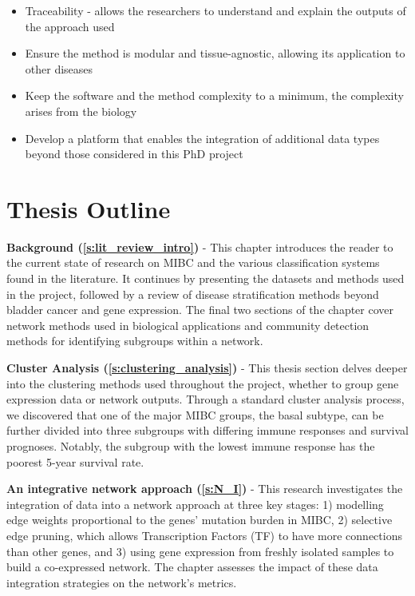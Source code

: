\begin{itemize}
    \item Traceability - allows the researchers to understand and explain the outputs of the approach used
    \item Ensure the method is modular and tissue-agnostic, allowing its application to other diseases
    \item Keep the software and the method complexity to a minimum, the complexity arises from the biology
    \item Develop a platform that enables the integration of additional data types beyond those considered in this PhD project
\end{itemize}

\section{Thesis Outline}

\textbf{Background (\cref{s:lit_review_intro})} - This chapter introduces the reader to the current state of research on MIBC and the various classification systems found in the literature. It continues by presenting the datasets and methods used in the project, followed by a review of disease stratification methods beyond bladder cancer and gene expression. The final two sections of the chapter cover network methods used in biological applications and community detection methods for identifying subgroups within a network.


\textbf{Cluster Analysis (\cref{s:clustering_analysis})} - This thesis section delves deeper into the clustering methods used throughout the project, whether to group gene expression data or network outputs. Through a standard cluster analysis process, we discovered that one of the major MIBC groups, the basal subtype, can be further divided into three subgroups with differing immune responses and survival prognoses. Notably, the subgroup with the lowest immune response has the poorest 5-year survival rate.

\textbf{An integrative network approach (\cref{s:N_I})} - This research investigates the integration of data into a network approach at three key stages: 1) modelling edge weights proportional to the genes' mutation burden in MIBC, 2) selective edge pruning, which allows Transcription Factors (TF) to have more connections than other genes, and 3) using gene expression from freshly isolated samples to build a co-expressed network. 
The chapter assesses the impact of these data integration strategies on the network's metrics.


